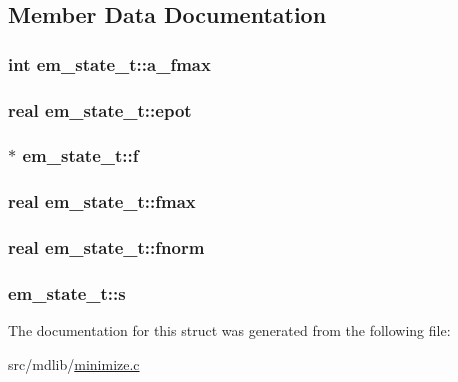 \subsection{\-Member \-Data \-Documentation}
\hypertarget{structem__state__t_a31d7ba83d5b3f033d94769fb8da7bd5b}{
\subsubsection[{a\-\_\-fmax}]{\setlength{\rightskip}{0pt plus 5cm}int {\bf em\-\_\-state\-\_\-t\-::a\-\_\-fmax}}}\label{structem__state__t_a31d7ba83d5b3f033d94769fb8da7bd5b}
\hypertarget{structem__state__t_a5dfa221d8f0a53795db611ac7c4f50dd}{
\subsubsection[{epot}]{\setlength{\rightskip}{0pt plus 5cm}real {\bf em\-\_\-state\-\_\-t\-::epot}}}\label{structem__state__t_a5dfa221d8f0a53795db611ac7c4f50dd}
\hypertarget{structem__state__t_a02369fada3124cffae5fb7871ffc6c44}{
\subsubsection[{f}]{$\ast$ {\bf em\-\_\-state\-\_\-t\-::f}}}\label{structem__state__t_a02369fada3124cffae5fb7871ffc6c44}
\hypertarget{structem__state__t_a3513532293a8a09954d07eee52de57c8}{
\subsubsection[{fmax}]{\setlength{\rightskip}{0pt plus 5cm}real {\bf em\-\_\-state\-\_\-t\-::fmax}}}\label{structem__state__t_a3513532293a8a09954d07eee52de57c8}
\hypertarget{structem__state__t_ae7959f870c53f37caff1d11e239bffe8}{
\subsubsection[{fnorm}]{\setlength{\rightskip}{0pt plus 5cm}real {\bf em\-\_\-state\-\_\-t\-::fnorm}}}\label{structem__state__t_ae7959f870c53f37caff1d11e239bffe8}
\hypertarget{structem__state__t_ad406602b47888b41f9cab778c321ca64}{
\subsubsection[{s}]{ {\bf em\-\_\-state\-\_\-t\-::s}}}\label{structem__state__t_ad406602b47888b41f9cab778c321ca64}


\-The documentation for this struct was generated from the following file\-:\begin{DoxyCompactItemize}
\item 
src/mdlib/\hyperlink{minimize_8c}{minimize.\-c}\end{DoxyCompactItemize}
